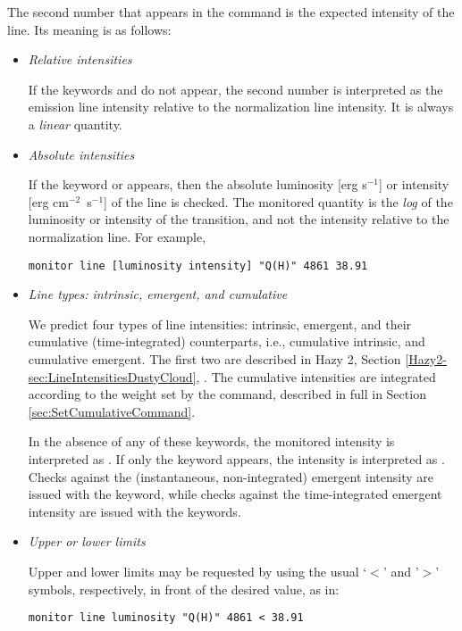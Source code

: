 The second number that appears in the command is the expected intensity of the line.
Its meaning is as follows:
%
\begin{itemize}

\item \emph{Relative intensities}

If the keywords  and  do not appear,
the second number is interpreted as the emission line intensity relative to the
normalization line intensity.
It is always a {\it linear} quantity.

\item \emph{Absolute intensities}

If the keyword  or  appears, then
the absolute luminosity [erg s$^{-1}$] or intensity [erg cm$^{-2}$~s$^{-1}$]
of the line is checked.
The monitored quantity is the {\it log} of the luminosity or intensity of
the transition, and not the intensity relative to the normalization line.
For example,
%
\begin{verbatim}
monitor line [luminosity intensity] "Q(H)" 4861 38.91
\end{verbatim}
%

\item \emph{Line types: intrinsic, emergent, and cumulative}

We predict four types of line intensities: intrinsic, emergent,
and their cumulative (time-integrated) counterparts, i.e.,
cumulative intrinsic, and cumulative emergent.
The first two are described in Hazy 2, Section
\ref{Hazy2-sec:LineIntensitiesDustyCloud}, 
.
The cumulative intensities are integrated according to the
weight set by the  command, described
in full in Section \ref{sec:SetCumulativeCommand}.

In the absence of any of these keywords, the monitored intensity is
interpreted as .
If only the keyword  appears, the intensity is
interpreted as .
Checks against the (instantaneous, non-integrated) emergent intensity
are issued with the  keyword, while checks against
the time-integrated emergent intensity are issued with the
 keywords.

\item \emph{Upper or lower limits}

Upper and lower limits may be requested by using the usual `$<$' and '$>$'
symbols, respectively, in front of the desired value, as in:
%
\begin{verbatim}
monitor line luminosity "Q(H)" 4861 < 38.91
\end{verbatim}

\end{itemize}

